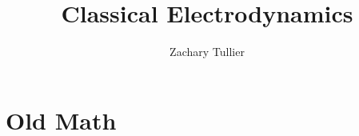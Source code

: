 \documentclass[12pt]{article}
\begin{document}
\title{Classical Electrodynamics}

\author[1]{Zachary Tullier}

\maketitle

\begin{abstract}

\end{abstract}


\section{Old Math} \label{section1}
\end{document}
